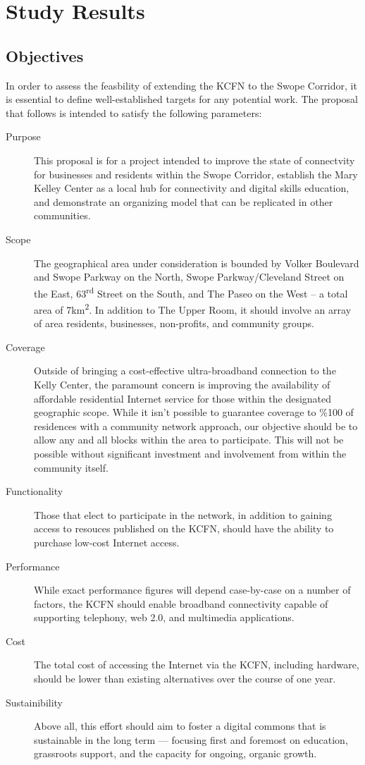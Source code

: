 \section{Study Results}
\subsection{Objectives}
In order to assess the feasbility of extending the KCFN to the Swope Corridor,
it is essential to define well-established targets for any potential work. The
proposal that follows is intended to satisfy the following parameters:
\begin{description}
\item[Purpose] This proposal is for a project intended to improve the state of
connectvity for businesses and residents within the Swope Corridor, establish
the Mary Kelley Center as a local hub for connectivity and digital skills
education, and demonstrate an organizing model that can be replicated in other
 communities.
\item[Scope] The geographical area under consideration is bounded by Volker
Boulevard and Swope Parkway on the North, Swope Parkway/Cleveland Street
on the East, 63\textsuperscript{rd} Street on the South, and The Paseo on the West
-- a total area of 7km\textsuperscript{2}. In addition to The Upper Room, it 
should involve an array of area residents, businesses, non-profits, and community groups.
\item[Coverage] Outside of bringing a cost-effective ultra-broadband connection
to the Kelly Center, the paramount concern is improving the availability of 
affordable residential Internet service for those within the designated geographic
scope. While it isn't possible to guarantee coverage to \%100 of residences with a community network approach,
our objective should be to allow any and all blocks within the area to participate. This
will not be possible without significant investment and involvement from within the
community itself.
\item[Functionality] Those that elect to participate in the network, in addition
to gaining access to resouces published on the KCFN, should have the
ability to purchase low-cost Internet access. 
\item[Performance] While exact performance figures will depend case-by-case on a
number of factors, the KCFN should enable broadband connectivity capable of supporting
telephony, web 2.0, and multimedia applications.
\item[Cost] The total cost of
accessing the Internet via the KCFN, including hardware, should be lower than existing
alternatives over the course of one year.
\item[Sustainibility] Above all, this effort should aim to foster a digital commons
that is sustainable in the long term --- focusing first and foremost on education, grassroots
support, and the capacity for ongoing, organic growth.
\end{description}
